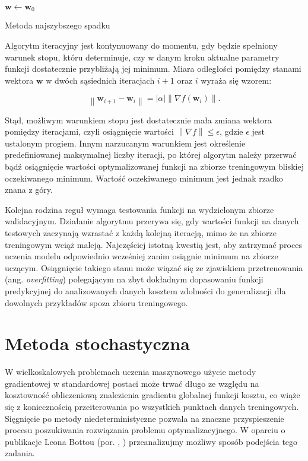 \documentclass{pracamgr}
\newcommand{\norm}[1]{\left\lVert#1\right\rVert}
\newcommand{\abs}[1]{\lvert#1\rvert}
\begin{document}
\begin{algorithm}

$\mathbf{w} \gets \mathbf{w}_0$ \;
\caption{Metoda najszybszego spadku}
\label{alg:gradient_descent}
\end{algorithm}

Algorytm iteracyjny jest kontynuowany do momentu, gdy będzie spełniony warunek stopu, któru determinuje, czy w danym kroku aktualne parametry funkcji dostatecznie przybliżają jej minimum. Miara odległości pomiędzy stanami wektora $\mathbf{w}$ w dwóch sąsiednich iteracjach $i+1$ oraz $i$ wyraża się wzorem:

\[
\norm{\mathbf{w}_{i+1} - \mathbf{w}_{i}} = \abs{\alpha} \norm{\nabla f(\mathbf{w}_{i})}.
\]

Stąd, możliwym warunkiem stopu jest dostatecznie mała zmiana wektora pomiędzy iteracjami, czyli osiągnięcie wartości $\norm{\nabla f} \leq \epsilon$, gdzie $\epsilon$ jest ustalonym progiem. Innym narzucanym warunkiem jest określenie predefiniowanej maksymalnej liczby iteracji, po której algorytm należy przerwać bądź osiągnięcie wartości optymalizowanej funkcji na zbiorze treningowym bliskiej oczekiwanego minimum. Wartość oczekiwanego minimum jest jednak rzadko znana z góry.

Kolejna rodzina reguł wymaga testowania funkcji na wydzielonym zbiorze walidacyjnym. Działanie algorytmu przerywa się, gdy wartości funkcji na danych testowych zaczynają wzrastać z każdą kolejną iteracją, mimo że na zbiorze treningowym wciąż maleją. Najczęściej istotną kwestią jest, aby zatrzymać proces uczenia modelu odpowiednio wcześniej zanim osiągnie minimum na zbiorze uczącym. Osiągnięcie takiego stanu może wiązać się ze zjawiskiem przetrenowania (ang. \textit{overfitting}) polegającym na zbyt dokładnym dopasowaniu funkcji predykcyjnej do analizowanych danych kosztem zdolności do generalizacji dla dowolnych przykładów spoza zbioru treningowego.

\section{Metoda stochastyczna}
W wielkoskalowych problemach uczenia maszynowego użycie metody gradientowej w standardowej postaci może trwać długo ze względu na kosztowność obliczeniową znalezienia gradientu globalnej funkcji kosztu, co wiąże się z koniecznością przeiterowania po wszystkich punktach danych treningowych. Sięgnięcie po metody niedeterministyczne pozwala na znaczne przyspieszenie procesu poszukiwania rozwiązania problemu optymalizacyjnego. W oparciu o publikacje Leona Bottou (por. \cite{bottou}, \cite{bottou2}) przeanalizujmy możliwy sposób podejścia tego zadania. 
\end{document}
